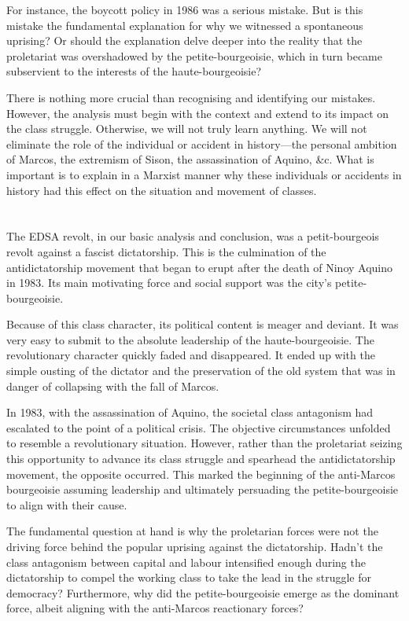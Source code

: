 For instance, the boycott policy in 1986 was a serious mistake.
But is this mistake the fundamental explanation 
for why we witnessed a spontaneous uprising?
Or should the explanation delve deeper 
into the reality that the proletariat was overshadowed 
by the petite-bourgeoisie, 
which in turn became subservient 
to the interests of the haute-bourgeoisie?

There is nothing more crucial 
than recognising and identifying our mistakes. 
However, the analysis must begin 
with the context and extend to its impact on the class struggle. 
Otherwise, we will not truly learn anything. 
We will not eliminate the role of the individual 
or accident in history---the 
personal ambition of Marcos, 
the extremism of Sison, 
the assassination of Aquino, \&c. 
What is important is to explain in a Marxist manner 
why these individuals or accidents in history 
had this effect on the situation and movement of classes.


\section{}
The EDSA revolt, 
in our basic analysis and conclusion, 
was a petit-bourgeois revolt against a fascist dictatorship. 
This is the culmination of the antidictatorship movement 
that began to erupt after the death of Ninoy Aquino in 1983. 
Its main motivating force and social support was the city's petite-bourgeoisie.

Because of this class character, 
its political content is meager and deviant. 
It was very easy to submit to the absolute leadership of the haute-bourgeoisie. 
The revolutionary character quickly faded and disappeared. 
It ended up with the simple ousting of the dictator 
and the preservation of the old system that was in danger of collapsing 
with the fall of Marcos.

In 1983, with the assassination of Aquino, 
the societal class antagonism had escalated 
to the point of a political crisis. 
The objective circumstances unfolded 
to resemble a revolutionary situation. 
However, rather than the proletariat seizing this opportunity 
to advance its class struggle 
and spearhead the antidictatorship movement, 
the opposite occurred. 
This marked the beginning of the anti-Marcos bourgeoisie 
assuming leadership and ultimately persuading 
the petite-bourgeoisie to align with their cause.

The fundamental question at hand 
is why the proletarian forces 
were not the driving force 
behind the popular uprising against the dictatorship. 
Hadn't the class antagonism between capital and labour 
intensified enough during the dictatorship 
to compel the working class 
to take the lead in the struggle for democracy? 
Furthermore, 
why did the petite-bourgeoisie emerge as the dominant force, 
albeit aligning with the anti-Marcos reactionary forces?



